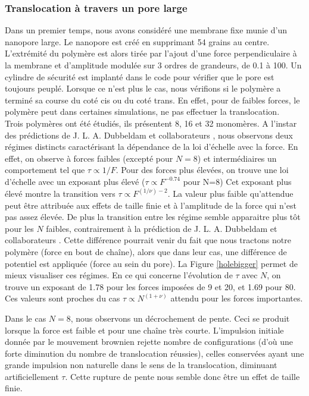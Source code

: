 \documentclass[a4paper,11pt]{article}
\begin{document}
\subsubsection*{Translocation à travers un pore large}

Dans un premier temps, nous avons considéré une membrane fixe munie d'un nanopore large. Le nanopore est créé en supprimant 54 grains au centre. L'extrémité du polymère est alors tirée par l'ajout d'une force perpendiculaire à la membrane et d'amplitude modulée sur 3 ordres de grandeurs, de 0.1 à 100. Un cylindre de sécurité est implanté dans le code pour vérifier que le pore est toujours peuplé. Lorsque ce n'est plus le cas, nous vérifions si le polymère a terminé sa course du coté cis ou du coté trans. En effet, pour de faibles forces, le polymère peut dans certaines simulations, ne pas effectuer la translocation.\\

Trois polymères ont été étudiés, ils présentent 8, 16 et 32 monomères. A l'instar des prédictions de J. L. A. Dubbeldam et collaborateurs \cite{traction}, nous observons deux régimes distincts caractérisant la dépendance de la loi d'échelle avec la force. En effet, on observe à forces faibles (excepté pour $N=8$) et intermédiaires un comportement tel que $\tau \propto 1/F$. Pour des forces plus élevées, on trouve une loi d'échelle avec un exposant plus élevé ($\tau \propto F^{-0.74}$ pour N=8) Cet exposant plus élevé montre la transition vers $\tau \propto F^{(1/\nu) -2}$. La valeur plus faible qu'attendue peut être attribuée aux effets de taille finie et à l'amplitude de la force qui n'est pas assez élevée. De plus la transition entre les régime semble apparaitre plus tôt pour les $N$ faibles, contrairement à la prédiction de J. L. A. Dubbeldam et collaborateurs \cite{traction}. Cette différence pourrait venir du fait que nous tractons notre polymère (force en bout de chaîne), alors que dans leur cas, une différence de potentiel est appliquée (force au sein du pore). La Figure \ref{holebigger} permet de mieux visualiser ces régimes. En ce qui concerne l'évolution de $\tau$ avec $N$, on trouve un exposant de 1.78 pour les forces imposées de 9 et 20, et 1.69 pour 80. Ces valeurs sont proches du cas $\tau \propto N^{(1+\nu)}$ attendu pour les forces importantes.

Dans le cas $N=8$, nous observons un décrochement de pente. Ceci se produit lorsque la force est faible et pour une chaîne très courte. L'impulsion initiale donnée par le mouvement brownien rejette nombre de configurations (d’où une forte diminution du nombre de translocation réussies), celles conservées ayant une grande impulsion non naturelle dans le sens de la translocation, diminuant artificiellement $\tau$. Cette rupture de pente nous semble donc être un effet de taille finie.
\end{document}
